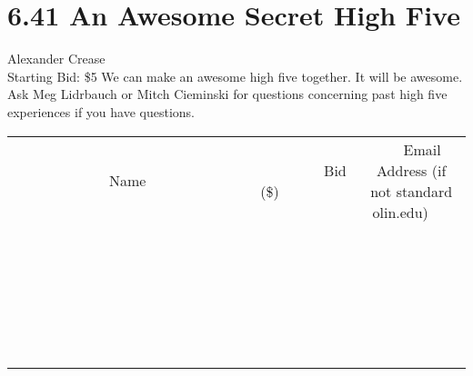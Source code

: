 \documentclass[11pt]{article}
\begin{document}
\section*{6.41 An Awesome Secret High Five}
Alexander Crease
\\
Starting Bid: \$5
\newline
We can make an awesome high five together. It will be awesome.
Ask Meg Lidrbauch or Mitch Cieminski for questions concerning past high five experiences if you have questions.
\\[6ex]
\begin{tabular}{c c c}
~~~~~~~~~~~~~Name~~~~~~~~~~~~~ & ~~~~~~~~~Bid (\$)~~~~~~~~~  & ~~~Email Address (if not standard olin.edu)~~~\\
 & & \\
\hline
 & & \\
\hline
 & & \\
\hline
 & & \\
\hline
 & & \\
\hline
 & & \\
\hline
 & & \\
\hline
 & & \\
\hline
 & & \\
\hline
 & & \\
\hline
 & & \\
\hline
 & & \\
\hline
 & & \\
\hline
 & & \\
\hline
 & & \\
\hline
 & & \\
\hline
 & & \\
\hline
 & & \\
\hline
 & & \\
\hline
 & & \\
\hline
 & & \\
\hline
 & & \\
\hline
 & & \\
\hline
 & & \\
\hline
 & & \\
\hline
 & & \\
\hline
\end{tabular}
\newpage
\end{document}
